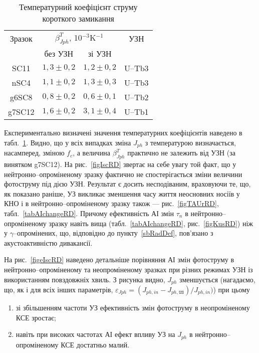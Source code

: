 \begin{table}[b]
\caption{\label{tabIscT}Температурний коефіцієнт струму короткого замикання
}
\center
\begin{tabular}{|c|c|c|c|}
\hline
Зразок&\multicolumn{2}{c|}{$\beta^T_{Jph}$, 10$^{-3}$K$^{-1}$}&УЗН\\ \cline{2-3}
&без УЗН & зі УЗН&\\ \hline
SC11&$1,3\pm0,2$&$1,2\pm0,2$&U--Tb3\\ \hline
nSC4&$1,1\pm0,2$&$1,3\pm0,3$&U--Tb3\\ \hline
g6SC8&$0,8\pm0,2$&$0,6\pm0,1$&U--Tb2\\ \hline
g7SC12&$1,6\pm0,2$&$3,1\pm0,4$&U--Tb1\\ \hline
\end{tabular}
\end{table}

Експериментально визначені значення температурних коефіцієнтів наведено в табл.~\ref{tabIscT}.
Видно, що у всіх випадках зміна $J_{ph}$ з температурою визначається, насамперед,
зміною $f_c$, а величина $\beta^T_{Jph}$ практично не залежить від УЗН (за винятком g7SC12).
На рис.~\ref{figIscRD} звертає на себе увагу той факт, що у нейтронно--опроміненому
зразку фактично не спостерігається зміни величини фотоструму під дією УЗН.
Результат є досить несподіваним, враховуючи те, що, як показано раніше,
УЗ викликає зменшення часу життя неосновних носіїв у КНО і в нейтронно--опроміненому зразку також ---
 рис.~\ref{figTAUrRD}, табл.~\ref{tabAIchangeRD}.
Причому ефективність АІ змін $\tau_n$ в нейтронно--опроміненому зразку навіть вища (табл.~\ref{tabAIchangeRD}, рис.~\ref{figKusRD}) ніж у $\gamma$--опромінених,
що, відповідно до пункту~\ref{sbRadDef}, пов'язано з акустоактивністю дивакансії.

На рис.~\ref{figeIscRD} наведено детальніше порівняння АІ змін фотоструму в нейтронно--опроміненому та неопроміненому
зразках при різних режимах УЗН із використанням повздовжніх хвиль.
З рисунка видно, $J_{ph}$ зменшується (нагадаємо, що, як і для всіх інших параметрів, $\varepsilon_{Jph}=(J_{ph,in}-J_{ph,\mathtt{US}})/{J_{ph,in}})$) при цьому
\begin{enumerate}[label=\asbuk*),leftmargin=0em,itemindent=1.5em]
\item зі збільшенням частоти УЗ ефективність змін фотоструму в неопроміненому КСЕ зростає;
\item навіть при високих частотах АІ ефект впливу УЗ на $J_{ph}$ в нейтронно--опроміненому КСЕ достатньо малий.
\end{enumerate}



